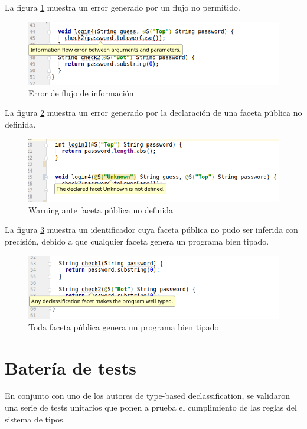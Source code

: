 La figura \ref{screen3} muestra un error generado por un flujo no permitido.

\begin{figure}[ht]
  \includegraphics[width=\textwidth]{imagenes/flow.png}
  \caption{Error de flujo de información}
  \label{screen3}
\end{figure}

La figura \ref{screen4} muestra un error generado por la declaración de una faceta pública no definida.

\begin{figure}[ht]
  \includegraphics[width=\textwidth]{imagenes/undefined.png}
  \caption{Warning ante faceta pública no definida}
  \label{screen4}
\end{figure}
\clearpage
La figura \ref{screen5} muestra un identificador cuya faceta pública no pudo ser inferida con precisión, debido a que cualquier faceta genera un programa bien tipado.

\begin{figure}[ht]
  \includegraphics[width=\textwidth]{imagenes/any.png}
  \caption{Toda faceta pública genera un programa bien tipado}
  \label{screen5}
\end{figure}

\section{Batería de tests}
En conjunto con uno de los autores de type-based declassification, se validaron una serie de tests unitarios que ponen a prueba el cumplimiento de las reglas del sistema de tipos.

